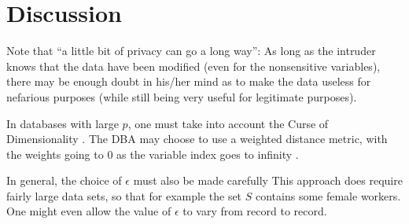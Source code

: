 \documentclass[11pt]{article}
\begin{document}
\section{Discussion}

Note that ``a little bit of privacy can go a long way'':  As long as the
intruder knows that the data have been modified (even for the
nonsensitive variables), there may be enough doubt in his/her mind as to
make the data useless for nefarious purposes (while still being very
useful for legitimate purposes).

In databases with large $p$, one must take into account the Curse of
Dimensionality \cite{beyer}.  The DBA may choose to use a weighted
distance metric, with the weights going to 0 as the variable index goes
to infinity \cite{matloff2015}.

In general, the choice of $\epsilon$ must also be made carefully
This approach does require fairly large data sets, so that for example
the set $S$ contains some female workers.  One might even allow the
value of $\epsilon$ to vary from record to record.
\end{document}
